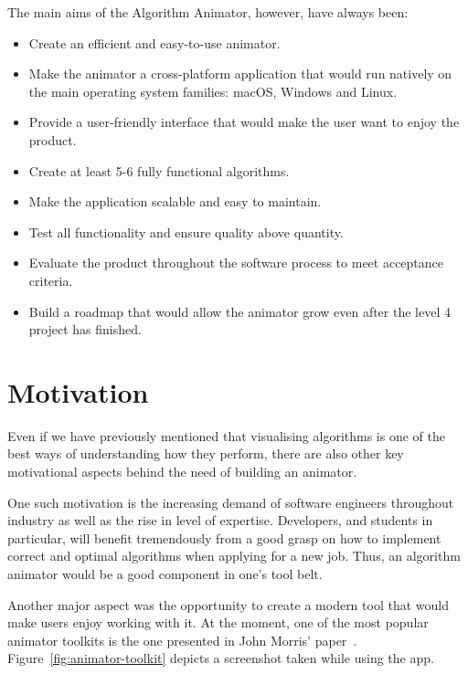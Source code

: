 \documentclass{l4proj}
\begin{document}
The main aims of the Algorithm Animator, however, have always been:
\begin{itemize}
	\item Create an efficient and easy-to-use animator.
	\item Make the animator a cross-platform application that would run natively on the main operating system families: macOS, Windows and Linux.
	\item Provide a user-friendly interface that would make the user want to enjoy the product.
	\item Create at least 5-6 fully functional algorithms.
	\item Make the application scalable and easy to maintain.
	\item Test all functionality and ensure quality above quantity.
	\item Evaluate the product throughout the software process to meet acceptance criteria.
	\item Build a roadmap that would allow the animator grow even after the level 4 project has finished.
\end{itemize}

\section{Motivation}

Even if we have previously mentioned that visualising algorithms is one of the best ways of understanding how they perform, there are also other key motivational aspects behind the need of building an animator.

One such motivation is the increasing demand of software engineers throughout industry as well as the rise in level of expertise. Developers, and students in particular, will benefit tremendously from a good grasp on how to implement correct and optimal algorithms when applying for a new job. Thus, an algorithm animator would be a good component in one's tool belt.

Another major aspect was the opportunity to create a modern tool that would make users enjoy working with it. At the
moment, one of the most popular animator toolkits is the one presented in John Morris' paper~\cite{animator-toolkit}.
Figure~\ref{fig:animator-toolkit} depicts a screenshot taken while using the app. \newpage
\end{document}
